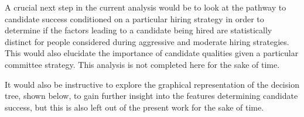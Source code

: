 \documentclass[12pt]{article}
\begin{document}
A crucial next step in the current analysis would be to look at the pathway to candidate success conditioned on a particular hiring strategy in order to determine if the factors leading to a candidate being hired are statistically distinct for people considered during aggressive and moderate hiring strategies. This would also elucidate the importance of candidate qualities given a particular committee strategy. This analysis is not completed here for the sake of time.

It would also be instructive to explore the graphical representation of the decision tree, shown below, to gain further insight into the features determining candidate success, but this is also left out of the present work for the sake of time.

\begin{figure}[H]
\end{figure}

\AtEndDocument{}
\end{document}
